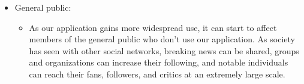 \documentclass[12pt, titlepage]{article}
\begin{document}
\begin{itemize}
\begin{itemize}
  \end{itemize}
  \item General public:
  \begin{itemize}
      \item[] As our application gains more widespread use, it can start to affect members of the general public who don't use our application. As society has seen with other social networks, breaking news can be shared, groups and organizations can increase their following, and notable individuals can reach their fans, followers, and critics at an extremely large scale.
  \end{itemize}
\end{itemize}
\end{document}
